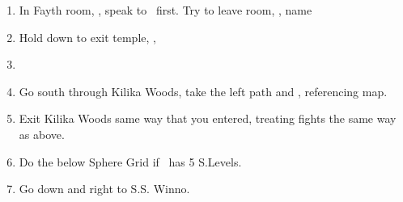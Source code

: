\begin{enumerate}[resume]
    \item In Fayth room, \sd, speak to \wakka\ first. Try to leave room, \sd, name \ifrit
    \item Hold down to exit temple, \cs[0:40], \sd
    \item \formation{\tidus}{\wakka}{\lulu}
    \item Go south through Kilika Woods, take the left path and , referencing map.
    \item Exit Kilika Woods same way that you entered, treating fights the same way as above.
    \item Do the below Sphere Grid if \tidus\ has 5 S.Levels.
    \item Go down and right to S.S. Winno. \sd
\end{enumerate}